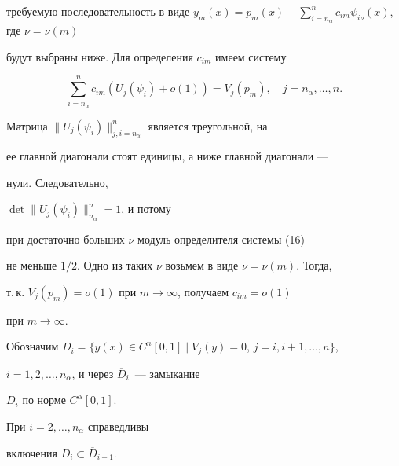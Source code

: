 \begin{pf}
требуемую последовательность в виде $y_m(x)=p_m(x)-


\sum\limits_{i=n_\alpha}^nc_{im}\psi_{i\nu}(x)$, где $\nu=\nu(m)$


будут выбраны ниже. Для определения $c_{im}$ имеем систему


\begin{equation}


\sum\limits_{i=n_\alpha}^n c_{im}(U_j(\psi_i)+o(1))=V_j(p_m),\quad


j=n_\alpha,\dotsc,n.


\end{equation}


Матрица $\| U_j(\psi_i)\|_{j,i=n_\alpha}^n$ является треугольной, на


ее главной диагонали стоят единицы, а ниже главной диагонали ---


нули. Следовательно,


$\det\| U_j(\psi_i)\|_{n_\alpha}^n =1$, и потому


при достаточно больших $\nu$ модуль определителя системы (16)


не меньше $1/2$. Одно из таких $\nu$ возьмем в виде $\nu=\nu(m)$. Тогда,


т.\,к. $V_j(p_m)=o(1)$ при $m\to\infty$, получаем $c_{im}=o(1)$


при $m\to\infty$.


\end{pf}





Обозначим $D_i=\{y(x)\in C^n[0,1]\mid V_j(y)=0$, $j=i,i+1,\dotsc,n\}$,


$i=1,2,\dotsc,n_\alpha$, и через $\overline D_i$~--- замыкание


$D_i$ по норме $C^\alpha[0,1]$.





\begin{lem}


При $i=2,\dotsc,n_\alpha$ справедливы


включения $D_i\subset \overline D_{i-1}$.


\end{lem}





